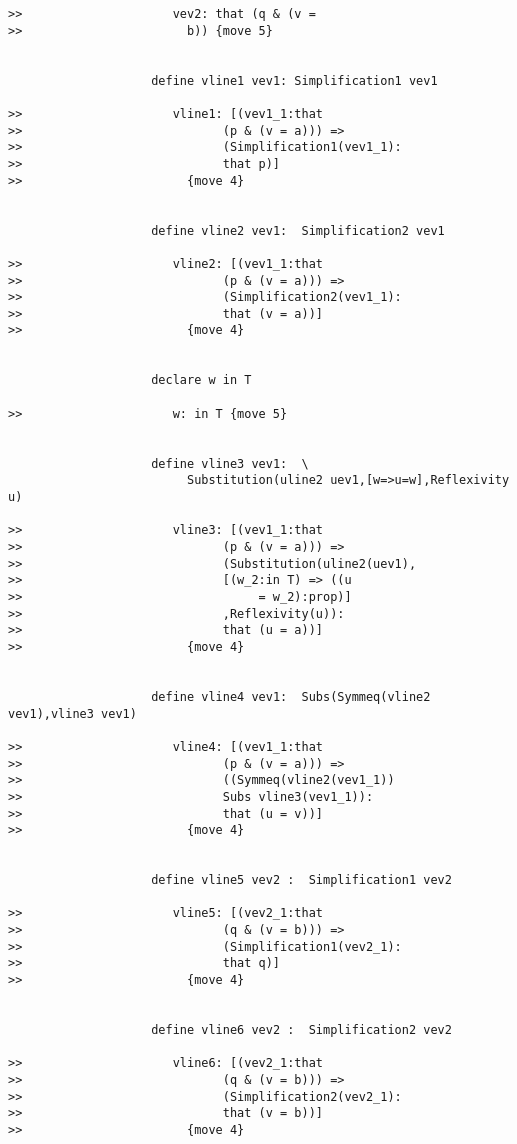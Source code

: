 \documentclass[12pt]{article}
\begin{document}
\begin{verbatim}
>>                     vev2: that (q & (v = 
>>                       b)) {move 5}


                    define vline1 vev1: Simplification1 vev1

>>                     vline1: [(vev1_1:that 
>>                            (p & (v = a))) => 
>>                            (Simplification1(vev1_1):
>>                            that p)]
>>                       {move 4}


                    define vline2 vev1:  Simplification2 vev1

>>                     vline2: [(vev1_1:that 
>>                            (p & (v = a))) => 
>>                            (Simplification2(vev1_1):
>>                            that (v = a))]
>>                       {move 4}


                    declare w in T

>>                     w: in T {move 5}


                    define vline3 vev1:  \
                         Substitution(uline2 uev1,[w=>u=w],Reflexivity u)

>>                     vline3: [(vev1_1:that 
>>                            (p & (v = a))) => 
>>                            (Substitution(uline2(uev1),
>>                            [(w_2:in T) => ((u 
>>                                 = w_2):prop)]
>>                            ,Reflexivity(u)):
>>                            that (u = a))]
>>                       {move 4}


                    define vline4 vev1:  Subs(Symmeq(vline2 vev1),vline3 vev1)

>>                     vline4: [(vev1_1:that 
>>                            (p & (v = a))) => 
>>                            ((Symmeq(vline2(vev1_1)) 
>>                            Subs vline3(vev1_1)):
>>                            that (u = v))]
>>                       {move 4}


                    define vline5 vev2 :  Simplification1 vev2

>>                     vline5: [(vev2_1:that 
>>                            (q & (v = b))) => 
>>                            (Simplification1(vev2_1):
>>                            that q)]
>>                       {move 4}


                    define vline6 vev2 :  Simplification2 vev2

>>                     vline6: [(vev2_1:that 
>>                            (q & (v = b))) => 
>>                            (Simplification2(vev2_1):
>>                            that (v = b))]
>>                       {move 4}



\end{verbatim}
\end{document}
